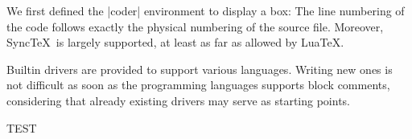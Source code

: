 \documentclass{article}
\begin{document}
%
We first defined the \CDRCode|coder| environment to display a box:
The line numbering of the code follows exactly the physical numbering of the source file.
Moreover, Sync\TeX\ is largely supported, at least as far as allowed by Lua\TeX.

Builtin drivers are provided to support various languages.
Writing new ones is not difficult as soon as the programming languages supports block comments,
considering that already existing drivers may serve as starting points.

\makeatletter
\def\CDR@Debug#1{\typeout{**** CDR DEBUG #1}}
\makeatother
TEST
\ExplSyntaxOn
{}
\ExplSyntaxOff
{}
\end{document}
